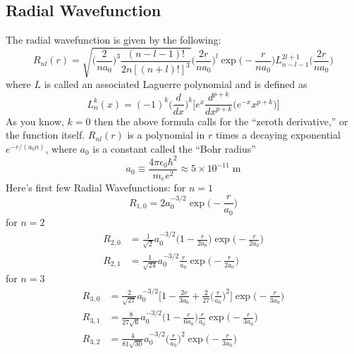 \documentclass[../main.tex]{subfiles}
\begin{document}
\subsection*{Radial Wavefunction}
The radial wavefunction is given by the following:
\begin{equation*}
    R_{nl}(r)=\sqrt{ \bigg(\frac{2}{na_0}\bigg)^3 \frac{(n - l - 1)!}{2n[(n + l)! ]^3}} \bigg(\frac{2r}{na_0}\bigg)^l \exp \biggl( - \frac{r}{na_0} \biggr) L_{n-l-1}^{2l+1}\biggl(\frac{2r}{na_0}\biggr)
\end{equation*}
where $L$ is called an associated Laguerre polynomial and is defined as
\begin{equation*}
    L_n^{k}(x) =(-1)^k\biggl(\frac{d}{dx}\biggr)^k\biggl[ e^x \frac{d^{p+k}}{dx^{p+k}}\bigl(e^{-x}x^{p+k}\bigr) \biggr]
\end{equation*}
As you know,  $k = 0$ then the above formula calls for the “zeroth derivative,” or the function itself. $ R_{nl}(r)$ is a polynomial in $r$ times a decaying exponential $e^{-r/(a_0n)}$, where $a_0$ is a constant called the “Bohr radius”
\begin{equation*}
    a_0\equiv \frac{4\pi \epsilon_0\hbar^2}{m_e e^2}\approx 5 \times 10^{-11} \;\text{m}
\end{equation*}
Here's first few Radial Wavefunctions: for $n=1$
\begin{equation*}
    R_{1,0}=2a_0^{-3/2}\exp \biggl(-\frac{r}{a_0}\biggr)
\end{equation*}
for $n=2$
\begin{align*}
    R_{2,0}&=\frac{1}{\sqrt{2}}a_0^{-3/2}\biggl(1-\frac{r}{2a_0}\biggr) \exp \biggl(-\frac{r}{2a_0}\biggr)\\
    R_{2,1}&=\frac{1}{\sqrt{24}}a_0^{-3/2} \frac{r}{a_0} \exp \biggl(-\frac{r}{2a_0}\biggr)
\end{align*}
for $n=3$
\begin{align*}
    R_{3,0}&=\frac{2}{\sqrt{27}} a_0^{-3/2} \biggl[1-\frac{2r}{3a_0}+\frac{2}{27}\biggl(\frac{r}{a_0}\biggr)^2 \biggr] \exp \biggl(-\frac{r}{3a_0}\biggr)\\
    R_{3,1}&=\frac{8}{27\sqrt{6}} a_0^{-3/2} \biggl(1-\frac{r}{6a_0}\biggr)\frac{r}{a_0} \exp \biggl(-\frac{r}{3a_0}\biggr)\\
    R_{3,2}&=\frac{4}{81\sqrt{30}} a_0^{-3/2} \biggl(\frac{r}{a_0}\biggr)^2 \exp \biggl(-\frac{r}{3a_0}\biggr)\\
\end{align*}
\end{document}
